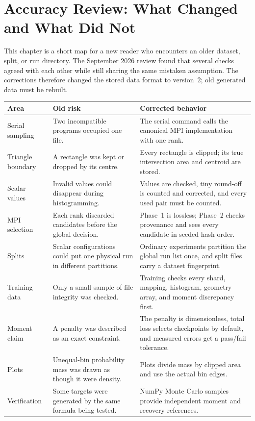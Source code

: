 \documentclass[11pt,a4paper]{report}
\renewcommand{\_}{\origtextunderscore\allowbreak}
\begin{document}
\chapter{Accuracy Review: What Changed and What Did Not}

This chapter is a short map for a new reader who encounters an older dataset, split, or run
directory. The September 2026 review found that several checks agreed with each other while
still sharing the same mistaken assumption. The corrections therefore changed the stored data
format to version~2; old generated data must be rebuilt.

\begin{longtable}{@{}p{3.2cm}p{5.2cm}p{6.0cm}@{}}
\toprule
\textbf{Area} & \textbf{Old risk} & \textbf{Corrected behavior} \\
\midrule
\endhead
Serial sampling & Two incompatible programs occupied one file. &
The serial command calls the canonical MPI implementation with one rank. \\
Triangle boundary & A rectangle was kept or dropped by its centre. &
Every rectangle is clipped; its true intersection area and centroid are stored. \\
Scalar values & Invalid values could disappear during histogramming. &
Values are checked, tiny round-off is counted and corrected, and every used pair must be counted. \\
MPI selection & Each rank discarded candidates before the global decision. &
Phase~1 is lossless; Phase~2 checks provenance and sees every candidate in seeded hash order. \\
Splits & Scalar configurations could put one physical run in different partitions. &
Ordinary experiments partition the global run list once, and split files carry a dataset fingerprint. \\
Training data & Only a small sample of file integrity was checked. &
Training checks every shard, mapping, histogram, geometry array, and moment discrepancy first. \\
Moment claim & A penalty was described as an exact constraint. &
The penalty is dimensionless, total loss selects checkpoints by default, and measured errors get a pass/fail tolerance. \\
Plots & Unequal-bin probability mass was drawn as though it were density. &
Plots divide mass by clipped area and use the actual bin edges. \\
Verification & Some targets were generated by the same formula being tested. &
NumPy Monte Carlo samples provide independent moment and recovery references. \\
\bottomrule
\end{longtable}
\end{document}
